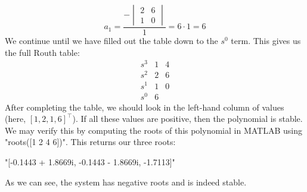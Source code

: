 $$a_1=\frac{-\begin{vmatrix}2&6\\1&0
\end{vmatrix}}{1}=6\cdot1=6$$
We continue until we have filled out the table down to the $s^0$ term. This gives us the full Routh table:
$$
\begin{array}{lcc}
     s^3& 1 &4\\
     s^2& 2&6\\
     s^1&1&0 \\
     s^0&6
\end{array}
$$
After completing the table, we should look in the left-hand column of values (here, $[1,2,1,6]^\top$). If all these values are positive, then the polynomial is stable. We may verify this by computing the roots of this polynomial in MATLAB using "roots([1 2 4 6])". This returns our three roots:

"[-0.1443 + 1.8669i, -0.1443 - 1.8669i, -1.7113]" 

As we can see, the system has negative roots and is indeed stable.

